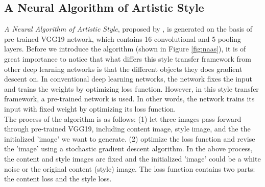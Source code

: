 \documentclass{article} %
\begin{document}
\subsection{A Neural Algorithm of Artistic Style}
\emph{A Neural Algorithm of Artistic Style}, proposed by \cite{1508.06576}, is generated on the basis of pre-trained VGG19 network, which contains 16 convolutional and 5 pooling layers. Before we introduce the algorithm (shown in Figure \ref{fig:naas}), it is of great importance to notice that what differs this style transfer framework from other deep learning networks is that the different objects they does gradient descent on. In conventional deep learning networks, the network fixes the input and trains the weights by optimizing loss function. However, in this style transfer framework, a pre-trained network is used. In other words, the network trains its input with fixed weight by optimizing its loss function.\\

The process of the algorithm is as follows: (1) let three images pass forward through pre-trained VGG19, including content image, style image, and the the initialized 'image' we want to generate. (2) optimize the loss function and revise the 'image' using a stochastic gradient descent algorithm. In the above process, the content and style images are fixed and the initialized 'image' could be a white noise or the original content (style) image. The loss function contains two parts: the content loss and the style loss.
\end{document}
